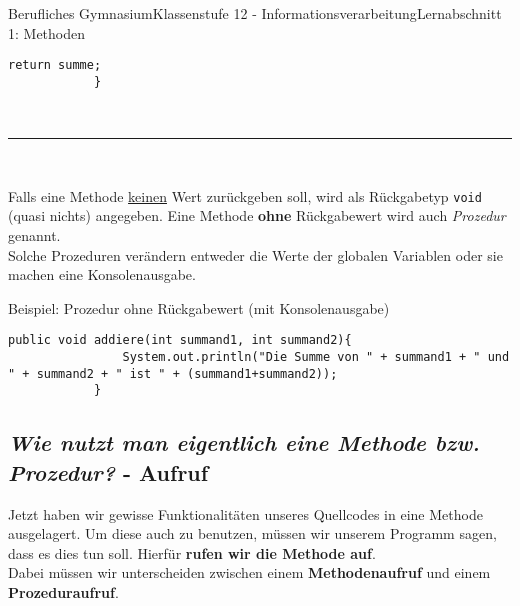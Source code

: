 \documentclass[11pt,oneside,openany,headings=optiontotoc,11pt,numbers=noenddot]{article}
\begin{document}
\begin{worksheet}{Berufliches Gymnasium}{Klassenstufe 12 - Informationsverarbeitung}{Lernabschnitt 1: Methoden}
\begin{minipage}[t]{0.48\textwidth}
\begin{lstlisting}[style=JavaInputStyle,frame=single]
				return summe;
			}
			\end{lstlisting}
		\end{minipage}\\
		\par\noindent
		\rule{\textwidth}{0.1pt}\\
		\par\noindent
		Falls eine Methode \underline{keinen} Wert zurückgeben soll, wird als Rückgabetyp \lstinline[style=JavaInputStyle]|void| (quasi \grqq{}nichts\grqq{}) angegeben. Eine Methode \textbf{ohne} Rückgabewert wird auch \textit{Prozedur} genannt.\\
		Solche Prozeduren verändern entweder die Werte der globalen Variablen oder sie machen eine Konsolenausgabe.\\
		\begin{minipage}[t]{\textwidth}
			\vspace*{0pt}
			Beispiel: Prozedur ohne Rückgabewert (mit Konsolenausgabe)
			\begin{lstlisting}[style=JavaInputStyle,frame=single]
			public void addiere(int summand1, int summand2){
				System.out.println("Die Summe von " + summand1 + " und " + summand2 + " ist " + (summand1+summand2));
			}
			\end{lstlisting}
		\end{minipage}
		\subsection{\textit{Wie nutzt man eigentlich eine Methode bzw. Prozedur?} - Aufruf}
		Jetzt haben wir gewisse Funktionalitäten unseres Quellcodes in eine Methode ausgelagert. Um diese auch zu benutzen, müssen wir unserem Programm sagen, dass es dies tun soll. Hierfür \textbf{rufen wir die Methode auf}.\\
		Dabei müssen wir unterscheiden zwischen einem \textbf{Methodenaufruf} und einem \textbf{Prozeduraufruf}.

\end{worksheet}
\end{document}
